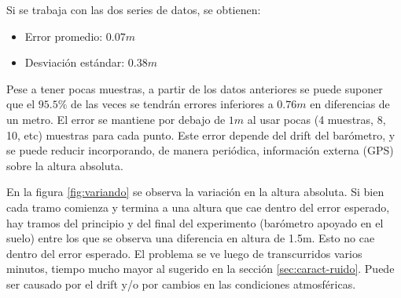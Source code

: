 \documentclass[main]{subfiles}
\begin{document}
Si se trabaja con las dos series de datos, se obtienen:

\begin{itemize}
\item Error promedio: $0.07m$
\item Desviaci\'on est\'andar: $0.38m$\\
\end{itemize}

\begin{figure}
\vspace{-10pt}

  \caption{}
\label{fig:1-metro-err}
\vspace{-110pt}
\end{figure}
Pese a tener pocas muestras, a partir de los datos anteriores se puede suponer que el $95.5 \%$ de las veces se tendr\'an errores inferiores a $0.76m$ en diferencias de un metro. El error se mantiene por debajo de $1m$ al usar pocas (4 muestras, 8, 10, etc) muestras para cada punto. Este error depende del drift del bar\'ometro, y se puede reducir incorporando, de manera peri\'odica, informaci\'on externa (GPS) sobre la altura absoluta.

En la figura \ref{fig:variando} se observa la variaci\'on en la altura absoluta. Si bien cada tramo comienza y termina a una altura que cae dentro del error esperado, hay tramos del principio y del final del experimento (bar\'ometro apoyado en el suelo) entre los que se observa una diferencia en altura de 1.5m. Esto no cae dentro del error esperado. El problema se ve luego de transcurridos varios minutos, tiempo mucho mayor al sugerido en la secci\'on \ref{sec:caract-ruido}. Puede ser causado por el drift y/o por cambios en las condiciones atmosf\'ericas.
\end{document}
